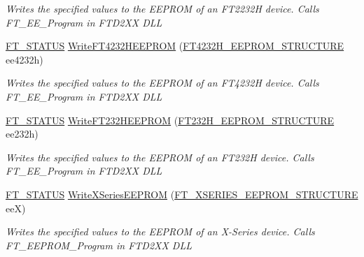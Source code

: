 \begin{DoxyCompactItemize}
\begin{DoxyCompactList}\small\item\em Writes the specified values to the E\+E\+P\+R\+OM of an F\+T2232H device. Calls F\+T\+\_\+\+E\+E\+\_\+\+Program in F\+T\+D2\+XX D\+LL \end{DoxyCompactList}\item 
\mbox{\hyperlink{class_f_t_d2_x_x___n_e_t_1_1_f_t_d_i_aabe20ad905cc4ccc1e35dd5b877d9a83}{F\+T\+\_\+\+S\+T\+A\+T\+US}} \mbox{\hyperlink{class_f_t_d2_x_x___n_e_t_1_1_f_t_d_i_a8b0ada92a4346617532634f56298349c}{Write\+F\+T4232\+H\+E\+E\+P\+R\+OM}} (\mbox{\hyperlink{class_f_t_d2_x_x___n_e_t_1_1_f_t_d_i_1_1_f_t4232_h___e_e_p_r_o_m___s_t_r_u_c_t_u_r_e}{F\+T4232\+H\+\_\+\+E\+E\+P\+R\+O\+M\+\_\+\+S\+T\+R\+U\+C\+T\+U\+RE}} ee4232h)
\begin{DoxyCompactList}\small\item\em Writes the specified values to the E\+E\+P\+R\+OM of an F\+T4232H device. Calls F\+T\+\_\+\+E\+E\+\_\+\+Program in F\+T\+D2\+XX D\+LL \end{DoxyCompactList}\item 
\mbox{\hyperlink{class_f_t_d2_x_x___n_e_t_1_1_f_t_d_i_aabe20ad905cc4ccc1e35dd5b877d9a83}{F\+T\+\_\+\+S\+T\+A\+T\+US}} \mbox{\hyperlink{class_f_t_d2_x_x___n_e_t_1_1_f_t_d_i_a6768adf2b22ff1e7df030e7a7a69f8d6}{Write\+F\+T232\+H\+E\+E\+P\+R\+OM}} (\mbox{\hyperlink{class_f_t_d2_x_x___n_e_t_1_1_f_t_d_i_1_1_f_t232_h___e_e_p_r_o_m___s_t_r_u_c_t_u_r_e}{F\+T232\+H\+\_\+\+E\+E\+P\+R\+O\+M\+\_\+\+S\+T\+R\+U\+C\+T\+U\+RE}} ee232h)
\begin{DoxyCompactList}\small\item\em Writes the specified values to the E\+E\+P\+R\+OM of an F\+T232H device. Calls F\+T\+\_\+\+E\+E\+\_\+\+Program in F\+T\+D2\+XX D\+LL \end{DoxyCompactList}\item 
\mbox{\hyperlink{class_f_t_d2_x_x___n_e_t_1_1_f_t_d_i_aabe20ad905cc4ccc1e35dd5b877d9a83}{F\+T\+\_\+\+S\+T\+A\+T\+US}} \mbox{\hyperlink{class_f_t_d2_x_x___n_e_t_1_1_f_t_d_i_aca18d7da23f85eddf6b38ca725c6e3ac}{Write\+X\+Series\+E\+E\+P\+R\+OM}} (\mbox{\hyperlink{class_f_t_d2_x_x___n_e_t_1_1_f_t_d_i_1_1_f_t___x_s_e_r_i_e_s___e_e_p_r_o_m___s_t_r_u_c_t_u_r_e}{F\+T\+\_\+\+X\+S\+E\+R\+I\+E\+S\+\_\+\+E\+E\+P\+R\+O\+M\+\_\+\+S\+T\+R\+U\+C\+T\+U\+RE}} eeX)
\begin{DoxyCompactList}\small\item\em Writes the specified values to the E\+E\+P\+R\+OM of an X-\/\+Series device. Calls F\+T\+\_\+\+E\+E\+P\+R\+O\+M\+\_\+\+Program in F\+T\+D2\+XX D\+LL \end{DoxyCompactList}\item 

\end{DoxyCompactItemize}
